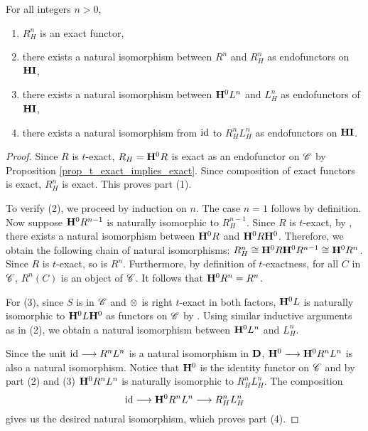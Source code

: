\begin{prop}\label{prop_LH_RH_properties}
For all integers $n > 0$,
\begin{enumerate}
\item $R_H^n$ is an exact functor,

\item there exists a natural isomorphism between $R^n$
and $R_H^n$ as endofunctors on $\mathbf{HI}$,

\item there exists a natural isomorphism between $\mathbf{H}^0L^n$
and $L_H^n$ as endofunctors of $\mathbf{HI}$,

\item there exists a natural isomorphism from $\mathrm{id}$ to 
$R_H^nL_H^n$ as endofunctors on $\mathbf{HI}$.
\end{enumerate}
\end{prop}
\begin{proof}
Since $R$ is $t$-exact, $R_H = \mathbf{H}^0 R$ is exact as an endofunctor 
on $\mathscr{C}$ by Proposition \ref{prop_t_exact_implies_exact}. 
Since composition of exact functors is exact, $R_H^n$ is exact. 
This proves part (1).

To verify (2), we proceed by induction on $n$. The case $n = 1$
follows by definition. Now suppose $\mathbf{H}^0R^{n - 1}$ is naturally
isomorphic to $R_H^{n - 1}$. Since $R$ is $t$-exact, by 
\cite[1.3.17(ii)]{BBD}, there exists a natural isomorphism between 
$\mathbf{H}^0R$ and $\mathbf{H}^0R\mathbf{H}^0$. Therefore, we obtain the following chain
of natural isomorphisms: $R_H^n \cong \mathbf{H}^0R\mathbf{H}^0R^{n - 1} \cong
\mathbf{H}^0R^n$. Since $R$ is $t$-exact, so is $R^n$. Furthermore, by
definition of $t$-exactness, for all $C$ in $\mathscr{C}$, $R^n(C)$ is 
an object of $\mathscr{C}$. It follows that $\mathbf{H}^0 R^n = R^n$.

For (3), since $S$ is in $\mathscr{C}$ and $\otimes$ is right 
$t$-exact in both factors, $\mathbf{H}^0L$ is naturally isomorphic to 
$\mathbf{H}^0L\mathbf{H}^0$ as functors on $\mathscr{C}$ by \cite[1.3.7(ii)]{BBD}. 
Using similar inductive arguments as in (2), we obtain a natural 
isomorphism between $\mathbf{H}^0L^n$ and $L_H^n$. 

Since the unit $\mathrm{id} \longrightarrow R^nL^n$ is a natural
isomorphism in $\mathbf{D}$, $\mathbf{H}^0 \longrightarrow \mathbf{H}^0R^nL^n$ is also 
a natural isomorphism. Notice that $\mathbf{H}^0$ is the identity
functor on $\mathscr{C}$ and by part (2) and (3) $\mathbf{H}^0R^nL^n$ is
naturally isomorphic to $R_H^nL_H^n$. The composition
\[
\mathrm{id} \longrightarrow \mathbf{H}^0R^nL^n \longrightarrow R_H^nL_H^n
\] 
gives us the desired natural isomorphism, which proves part (4).
\end{proof}

